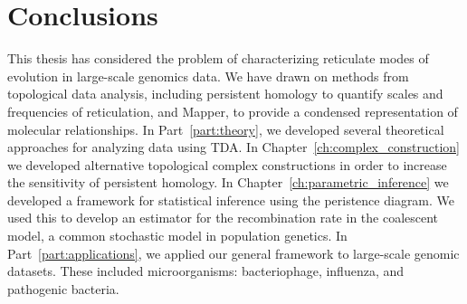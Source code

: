 
\chapter{Conclusions}
\label{ch:conclusions}

This thesis has considered the problem of characterizing reticulate modes of evolution in large-scale genomics data.
We have drawn on methods from topological data analysis, including persistent homology to quantify scales and frequencies of reticulation, and Mapper, to provide a condensed representation of molecular relationships.
In Part~\ref{part:theory}, we developed several theoretical approaches for analyzing data using TDA. 
In Chapter~\ref{ch:complex_construction} we developed alternative topological complex constructions in order to increase the sensitivity of persistent homology.
In Chapter~\ref{ch:parametric_inference} we developed a framework for statistical inference using the peristence diagram.
We used this to develop an estimator for the recombination rate in the coalescent model, a common stochastic model in population genetics.
In Part~\ref{part:applications}, we applied our general framework to large-scale genomic datasets.
These included microorganisms: bacteriophage, influenza, and pathogenic bacteria.
